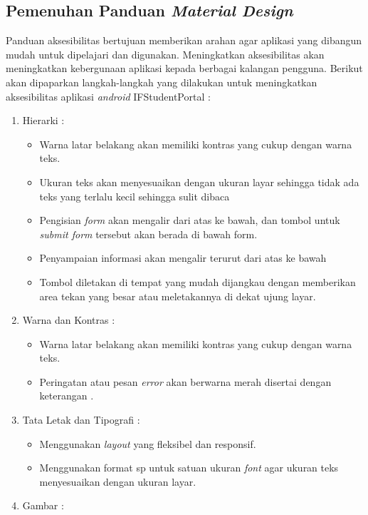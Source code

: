 \subsection{Pemenuhan Panduan \textit{Material Design}}
Panduan aksesibilitas bertujuan memberikan arahan agar aplikasi yang dibangun mudah untuk dipelajari dan digunakan. Meningkatkan aksesibilitas akan meningkatkan kebergunaan aplikasi kepada berbagai kalangan pengguna. Berikut akan dipaparkan langkah-langkah yang dilakukan untuk meningkatkan aksesibilitas aplikasi \textit{android} IFStudentPortal :
\begin{enumerate} 
    \item Hierarki : 
    \begin{itemize}
        \item Warna latar belakang akan memiliki kontras yang cukup dengan warna teks.
        \item Ukuran teks akan menyesuaikan dengan ukuran layar sehingga tidak ada teks yang terlalu kecil sehingga sulit dibaca
        \item Pengisian \textit{form} akan mengalir dari atas ke bawah, dan tombol untuk \textit{submit form} tersebut akan berada di bawah form.
        \item Penyampaian informasi akan mengalir terurut dari atas ke bawah
        \item Tombol diletakan di tempat yang mudah dijangkau dengan memberikan area tekan yang besar atau meletakannya di dekat ujung layar.
    \end{itemize}
    \item Warna dan Kontras : 
    \begin{itemize}
        \item Warna latar belakang akan memiliki kontras yang cukup dengan warna teks.
        \item Peringatan atau pesan \textit{error} akan berwarna merah disertai dengan keterangan .
    \end{itemize}
    \item Tata Letak dan Tipografi : 
    \begin{itemize}
        \item Menggunakan \textit{layout} yang fleksibel dan responsif.
        \item Menggunakan format sp untuk satuan ukuran \textit{font} agar ukuran teks menyesuaikan dengan ukuran layar.
        \end{itemize}
    \item Gambar : 
    \begin{itemize}

\end{itemize}
\end{enumerate}
